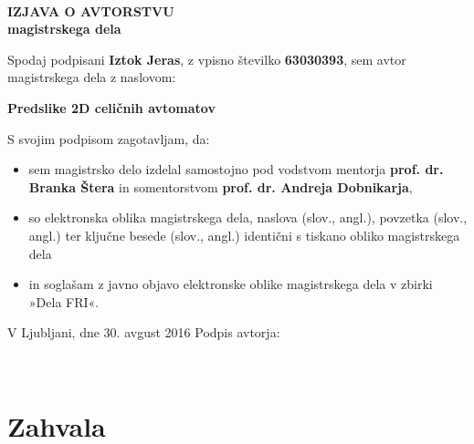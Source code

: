 \documentclass[12pt,a4paper,openany,twoside]{book}
\begin{document}
\ \thispagestyle{empty}
\newpage


\thispagestyle{empty}

\vspace*{2cm}
\begin{center}
{\Large \textbf{IZJAVA O AVTORSTVU \\ \vspace{0.5cm} magistrskega dela}}
\end{center}
\vspace{1cm}

Spodaj podpisani \textbf{Iztok Jeras},
z vpisno številko \textbf{63030393},
sem avtor magistrskega dela z naslovom:

\vspace{1cm}
\hspace{1cm}\textbf{Predslike 2D celičnih avtomatov}
\vspace{1cm}

S svojim podpisom zagotavljam, da:
\begin{itemize}
\item sem magistrsko delo izdelal samostojno pod vodstvom mentorja \textbf{prof. dr. Branka Štera} in somentorstvom \textbf{prof. dr. Andreja Dobnikarja},
\item so elektronska oblika magistrskega dela, naslova (slov., angl.), povzetka (slov., angl.) ter ključne besede (slov., angl.) identični s tiskano obliko magistrskega dela
\item in soglašam z javno objavo elektronske oblike magistrskega dela v zbirki »Dela FRI«.
\end{itemize}

\vspace{3cm}
V Ljubljani, dne 30. avgust 2016 \hfill Podpis avtorja:
\newpage 

\ \thispagestyle{empty}
\newpage


\chapter*{Zahvala}

\thispagestyle{empty}
\end{document}
